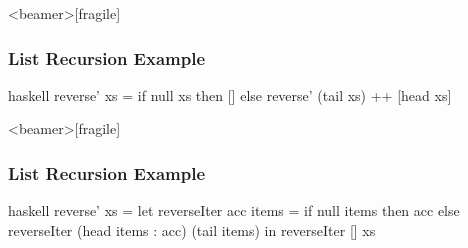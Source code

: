 \documentclass[dvipsnames]{beamer}
\theoremstyle{plain}
\begin{document}
\begin{frame}<beamer>[fragile]
  \frametitle{List Recursion Example}

  \begin{example}
    \begin{pygments}{haskell}
reverse' xs =
    if null xs
    then []
    else reverse' (tail xs) ++ [head xs]
    \end{pygments}
  \end{example}
\end{frame}

\begin{frame}<beamer>[fragile]
  \frametitle{List Recursion Example}

  \begin{example}
    \begin{pygments}{haskell}
reverse' xs =
    let
        reverseIter acc items =
            if null items
            then acc
            else reverseIter (head items : acc) (tail items)
    in
        reverseIter [] xs
    \end{pygments}
  \end{example}
\end{frame}
\end{document}
